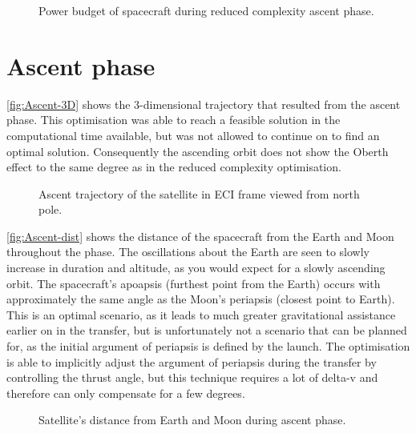 \begin{figure}
\centering
\def\svgwidth{\figurewidth}

\caption{Power budget of spacecraft during reduced complexity ascent phase.} \label{fig:Ascent2-energy}
\end{figure}


\clearpage


\section{Ascent phase} \label{sec:Ascent}

\autoref{fig:Ascent-3D} shows the 3-dimensional trajectory that resulted from the ascent phase. This optimisation was able to reach a feasible solution in the computational time available, but was not allowed to continue on to find an optimal solution. Consequently the ascending orbit does not show the Oberth effect to the same degree as in the reduced complexity optimisation.

\begin{figure}[h]
\centering
\def\svgwidth{\figurewidth}

\caption{Ascent trajectory of the satellite in ECI frame viewed from north pole.} \label{fig:Ascent-3D}
\end{figure}

\autoref{fig:Ascent-dist} shows the distance of the spacecraft from the Earth and Moon throughout the phase. The oscillations about the Earth are seen to slowly increase in duration and altitude, as you would expect for a slowly ascending orbit. The spacecraft's apoapsis (furthest point from the Earth) occurs with approximately the same angle as the Moon's periapsis (closest point to Earth). This is an optimal scenario, as it leads to much greater gravitational assistance earlier on in the transfer, but is unfortunately not a scenario that can be planned for, as the initial argument of periapsis is defined by the launch. The optimisation is able to implicitly adjust the argument of periapsis during the transfer by controlling the thrust angle, but this technique requires a lot of delta-v and therefore can only compensate for a few degrees.

\begin{figure}
\centering
\def\svgwidth{\figurewidth}

\caption{Satellite's distance from Earth and Moon during ascent phase.} \label{fig:Ascent-dist}
\end{figure}

